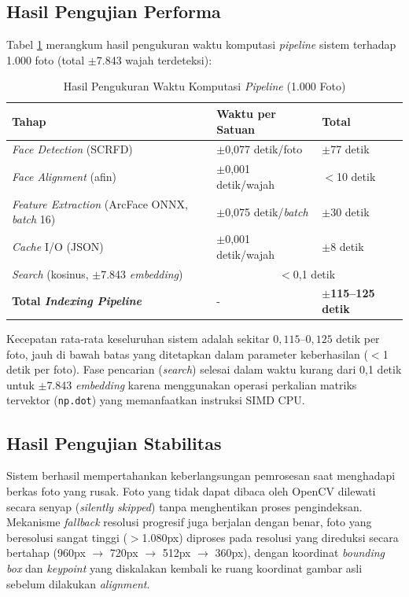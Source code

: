 \subsection{Hasil Pengujian Performa}

Tabel \ref{tab:hasil performa} merangkum hasil pengukuran waktu komputasi \textit{pipeline} sistem terhadap 1.000 foto (total $\pm$7.843 wajah terdeteksi):

\begin{table}[H]
    \caption{Hasil Pengukuran Waktu Komputasi \textit{Pipeline} (1.000 Foto)}
    \label{tab:hasil performa}
    \begin{tabularx}{\textwidth}{|l|X|X|}
    \hline
    \textbf{Tahap} & \textbf{Waktu per Satuan} & \textbf{Total} \\ \hline
    \textit{Face Detection} (SCRFD) & $\pm$0,077 detik/foto & $\pm$77 detik \\ \hline
    \textit{Face Alignment} (afin) & $\pm$0,001 detik/wajah & $<$10 detik \\ \hline
    \textit{Feature Extraction} (ArcFace ONNX, \textit{batch} 16) & $\pm$0,075 detik/\textit{batch} & $\pm$30 detik \\ \hline
    \textit{Cache} I/O (JSON) & $\pm$0,001 detik/wajah & $\pm$8 detik \\ \hline
    \textit{Search} (kosinus, $\pm$7.843 \textit{embedding}) & \multicolumn{2}{c|}{$<$0,1 detik} \\ \hline
    \textbf{Total \textit{Indexing Pipeline}} & - & \textbf{$\pm$115–125 detik} \\ \hline
    \end{tabularx}
\end{table}

Kecepatan rata-rata keseluruhan sistem adalah sekitar $0{,}115$–$0{,}125$ detik per foto, jauh di bawah batas yang ditetapkan dalam parameter keberhasilan ($<$1 detik per foto). Fase pencarian (\textit{search}) selesai dalam waktu kurang dari 0,1 detik untuk $\pm$7.843 \textit{embedding} karena menggunakan operasi perkalian matriks tervektor (\texttt{np.dot}) yang memanfaatkan instruksi SIMD CPU.

\subsection{Hasil Pengujian Stabilitas}

Sistem berhasil mempertahankan keberlangsungan pemrosesan saat menghadapi berkas foto yang rusak. Foto yang tidak dapat dibaca oleh OpenCV dilewati secara senyap (\textit{silently skipped}) tanpa menghentikan proses pengindeksan. Mekanisme \textit{fallback} resolusi progresif juga berjalan dengan benar, foto yang beresolusi sangat tinggi ($>$1.080px) diproses pada resolusi yang direduksi secara bertahap (960px $\rightarrow$ 720px $\rightarrow$ 512px $\rightarrow$ 360px), dengan koordinat \textit{bounding box} dan \textit{keypoint} yang diskalakan kembali ke ruang koordinat gambar asli sebelum dilakukan \textit{alignment}.

